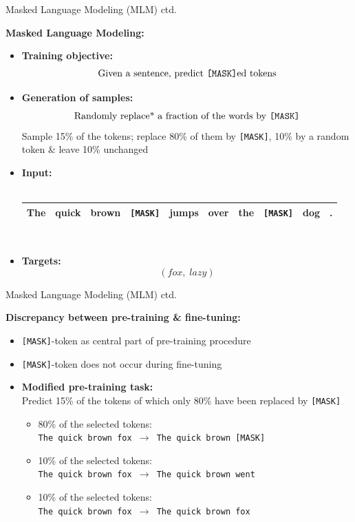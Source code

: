 \documentclass[]{beamer}
\begin{document}
\begin{frame}{Masked Language Modeling (MLM) ctd.}

\textbf{Masked Language Modeling:}

\begin{itemize}
\item \textbf{Training objective:} $$\text{Given a sentence, predict \texttt{[MASK]}ed tokens}$$
\item \textbf{Generation of samples:} $$\text{Randomly replace* a fraction of the words by \texttt{[MASK]}}$$
  \scriptsize *Sample 15\% of the tokens; replace 80\% of them by \texttt{[MASK]}, 10\% by a random token \& leave 10\% unchanged
\item \normalsize \textbf{Input:}\\\mbox{}\\
			\footnotesize
\begin{tabular}{|cccccccccc|}
\hline
The & quick & brown & \cellcolor{blue!65}\texttt{[MASK]} & jumps & over & the & \cellcolor{blue!65}\texttt{[MASK]} & dog & . \\
\hline
\end{tabular}\\\mbox{}
\item \normalsize \textbf{Targets:} $$(fox,\; lazy)$$
\end{itemize}
\end{frame}



\begin{frame}{Masked Language Modeling (MLM) ctd.}

\textbf{Discrepancy between pre-training \& fine-tuning:}

	\begin{itemize}
		\item \texttt{[MASK]}-token as central part of pre-training procedure
		\item \texttt{[MASK]}-token does not occur during fine-tuning
		\item \textbf{Modified pre-training task:}\\
					Predict 15\% of the tokens of which only 80\% have been replaced by \texttt{[MASK]}
					\begin{itemize}
						\item 80\% of the selected tokens:\\
									\texttt{The quick brown fox $\rightarrow$ The quick brown [MASK]}
						\item 10\% of the selected tokens:\\
									\texttt{The quick brown fox $\rightarrow$ The quick brown went}
						\item 10\% of the selected tokens:\\
									\texttt{The quick brown fox $\rightarrow$ The quick brown fox}
					\end{itemize}
	\end{itemize}
\end{frame}
\end{document}

